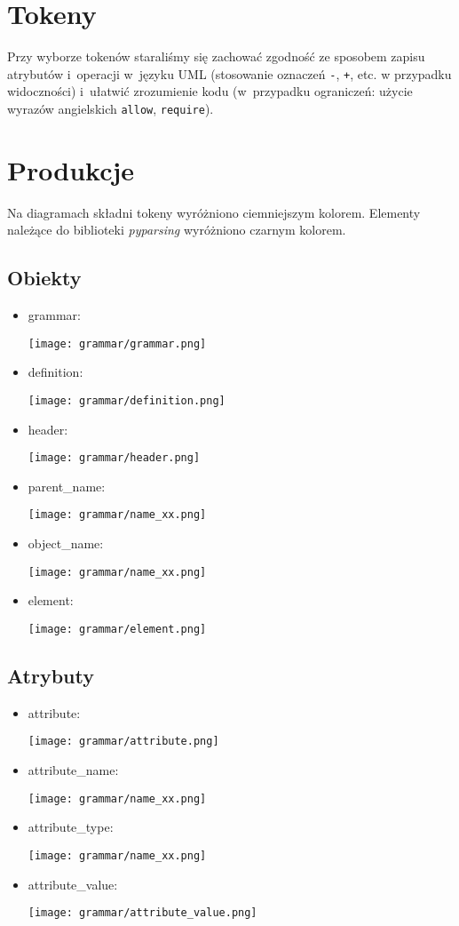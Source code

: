 \section{Tokeny}
Przy wyborze tokenów staraliśmy się zachować zgodność ze sposobem zapisu atrybutów i~operacji w~języku UML (stosowanie oznaczeń \texttt{-}, \texttt{+}, etc. w przypadku widoczności) i~ułatwić zrozumienie kodu (w~przypadku ograniczeń: użycie wyrazów angielskich \texttt{allow}, \texttt{require}).


\section{Produkcje}
Na diagramach składni tokeny wyróżniono ciemniejszym kolorem. Elementy należące do biblioteki \emph{pyparsing} wyróżniono czarnym kolorem.

\subsection{Obiekty}
\begin{itemize}
\item grammar:

\texttt{[image: grammar/grammar.png]}

\item definition:

\texttt{[image: grammar/definition.png]}

\item header:

\texttt{[image: grammar/header.png]}

\item parent\_name:

\texttt{[image: grammar/name\_xx.png]}

\item object\_name:

\texttt{[image: grammar/name\_xx.png]}

\item element:

\texttt{[image: grammar/element.png]}
\end{itemize}
\subsection{Atrybuty}
\begin{itemize}
\item attribute:

\texttt{[image: grammar/attribute.png]}

\item attribute\_name:

\texttt{[image: grammar/name\_xx.png]}

\item attribute\_type:

\texttt{[image: grammar/name\_xx.png]}

\item attribute\_value:

\texttt{[image: grammar/attribute\_value.png]}
\end{itemize}
